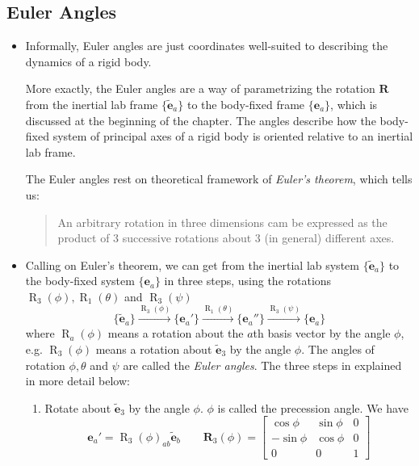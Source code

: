 \documentclass[11pt, a4paper]{article}
\newcommand{\e}{\mathbf{e}} %
\newcommand{\mat}[1]{\mathbf{#1}} %
\begin{document}
\subsection{Euler Angles}


\begin{itemize}

	\item Informally, Euler angles are just coordinates well-suited to describing the dynamics of a rigid body. 
	
	More exactly, the Euler angles are a way of parametrizing the rotation $ \mat{R} $ from the inertial lab frame $ \{\tilde{\e}_{a} \} $ to the body-fixed frame $ \{\e_{a}\} $, which is discussed at the beginning of the chapter. The angles describe how the body-fixed system of principal axes of a rigid body is oriented relative to an inertial lab frame. 
	
	The Euler angles rest on theoretical framework of  \textit{Euler's theorem}, which tells us:
	\begin{quote}
		An arbitrary rotation in three dimensions cam be expressed as the product of 3 successive rotations about 3 (in general) different axes.
	\end{quote}

	
	\item Calling on Euler's theorem, we can get from the inertial lab system $ \{ \tilde{\e}_{a} \} $ to the body-fixed system $ \{\e_{a}\} $ in three steps, using the rotations $ \operatorname{R}_{3}(\phi), \operatorname{R}_{1}(\theta) $ and $ \operatorname{R}_{3}(\psi) $
	\begin{equation*}
		\{\tilde{\e}_{a} \} \stackrel{\operatorname{R}_{3}(\phi)}{\to} \{\e_{a}' \} \stackrel{\operatorname{R}_{1}(\theta)}{\to} 
		\{\e_{a}'' \} \stackrel{\operatorname{R}_{3}(\psi)}{\to} \{\e_{a} \}
	\end{equation*}
	where $ \operatorname{R}_{a}(\phi) $ means a rotation about the $ a $th basis vector by the angle $ \phi $, e.g. $ \operatorname{R}_{3}(\phi) $ means a rotation about $ \tilde{\e}_{3} $ by the angle $ \phi $. The angles of rotation $ \phi, \theta $ and $ \psi $ are called the \textit{Euler angles}. The three steps in explained in more detail below:
	\begin{enumerate}
		\item Rotate about $ \tilde{\e}_{3} $ by the angle $ \phi $. $ \phi $ is called the precession angle. We have
		\[
			\e_{a}' = \operatorname{R}_{3}(\phi)_{ab} \tilde{\e}_{b} \qquad \mathbf{R}_{3} (\phi) = 
			\begin{bmatrix}
				\cos \phi & \sin \phi & 0\\
				- \sin \phi & \cos \phi & 0\\
				0 & 0 & 1
			\end{bmatrix}
		\]
		

\end{enumerate}
\end{itemize}
\end{document}

